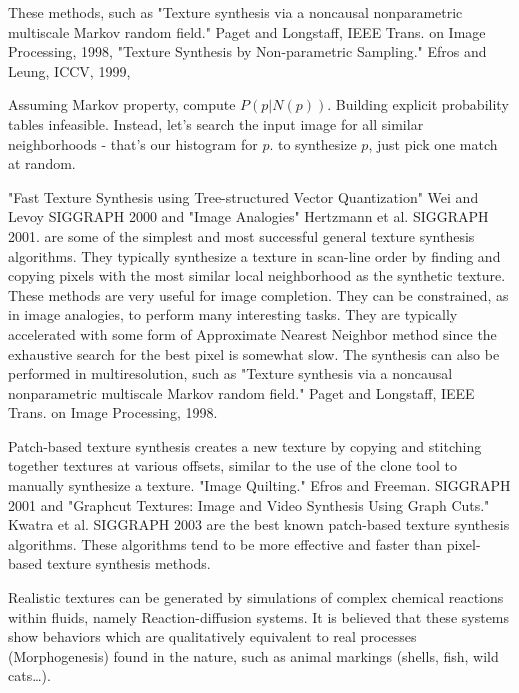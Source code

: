 \begin{compactdesc}
	\item[\lp{Pixel-based texture synthesis}] 
		These methods, such as "Texture synthesis via a noncausal nonparametric multiscale Markov random field." Paget and Longstaff, IEEE Trans. on Image Processing, 1998, "Texture Synthesis by Non-parametric Sampling." Efros and Leung, ICCV, 1999,
		\begin{itemize*}[label=\colorbullet]
			\item Assuming Markov property, compute $P(p|N(p))$. Building explicit probability tables infeasible. Instead, let's search the input image for all similar neighborhoods - that's our histogram for $p$. to synthesize $p$, just pick one match at random.
		\end{itemize*}
		"Fast Texture Synthesis using Tree-structured Vector Quantization" Wei and Levoy SIGGRAPH 2000 and "Image Analogies" Hertzmann et al. SIGGRAPH 2001. are some of the simplest and most successful general texture synthesis algorithms. They typically synthesize a texture in scan-line order by finding and copying pixels with the most similar local neighborhood as the synthetic texture. These methods are very useful for image completion. They can be constrained, as in image analogies, to perform many interesting tasks. They are typically accelerated with some form of Approximate Nearest Neighbor method since the exhaustive search for the best pixel is somewhat slow. The synthesis can also be performed in multiresolution, such as "Texture synthesis via a noncausal nonparametric multiscale Markov random field." Paget and Longstaff, IEEE Trans. on Image Processing, 1998.
	\item[\lp{Patch-based texture synthesis}] Patch-based texture synthesis creates a new texture by copying and stitching together textures at various offsets, similar to the use of the clone tool to manually synthesize a texture. "Image Quilting." Efros and Freeman. SIGGRAPH 2001 and "Graphcut Textures: Image and Video Synthesis Using Graph Cuts." Kwatra et al. SIGGRAPH 2003 are the best known patch-based texture synthesis algorithms. These algorithms tend to be more effective and faster than pixel-based texture synthesis methods.
	\item[\lp{Chemistry based}] Realistic textures can be generated by simulations of complex chemical reactions within fluids, namely Reaction-diffusion systems. It is believed that these systems show behaviors which are qualitatively equivalent to real processes (Morphogenesis) found in the nature, such as animal markings (shells, fish, wild cats\ldots).

\end{compactdesc}
